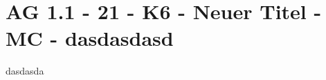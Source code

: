 \section{AG 1.1 - 21 - K6 - Neuer Titel - MC - dasdasdasd}

\begin{beispiel}[AG 1.1]{1}
dasdasda
\end{beispiel}